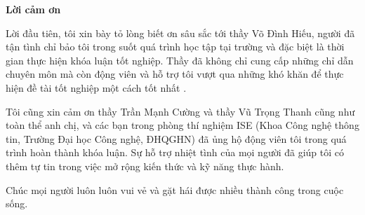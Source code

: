 \begin{center}
\textbf{\large{Lời cảm ơn}	}
\end{center}

Lời đầu tiên, tôi xin bày tỏ lòng biết ơn sâu sắc tới thầy Võ Đình Hiếu, người đã tận tình chỉ bảo tôi trong suốt quá trình học tập tại trường và đặc biệt là thời gian thực hiện khóa luận tốt nghiệp.
Thầy đã không chỉ cung cấp những chỉ dẫn chuyên môn mà còn động viên và hỗ trợ tôi vượt qua những khó khăn để thực hiện đề tài tốt nghiệp một cách tốt nhất .

Tôi cũng xin cảm ơn thầy Trần Mạnh Cường và thầy Vũ Trọng Thanh cũng như toàn thể anh chị, và các bạn trong phòng thí nghiệm ISE (Khoa Công nghệ thông tin, Trường Đại học Công nghệ, ĐHQGHN) đã ủng hộ động viên tôi trong quá trình hoàn thành khóa luận.
Sự hỗ trợ nhiệt tình của mọi người đã giúp tôi có thêm tự tin trong việc mở rộng kiến thức và kỹ năng thực hành.

Chúc mọi người luôn luôn vui vẻ và gặt hái được nhiều thành công trong cuộc sống.

